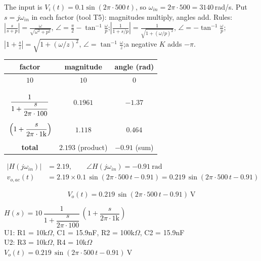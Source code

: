 \documentclass[11pt]{article}
\begin{document}
The input is $V_i(t) = 0.1\sin\left(2\pi\cdot 500\,t\right)$, so $\omega_{in} = 2\pi\cdot 500 = 3140$\,rad/s. Put $s=j\omega_{in}$ in each factor (tool T5): magnitudes multiply, angles add.
{\small Rules: $\left|\frac{s}{s+p}\right| = \frac{\omega}{\sqrt{\omega^2+p^2}}$, $\angle = \frac{\pi}{2}-\tan^{-1}\frac{\omega}{p}$;\quad $\left|\frac{1}{1+s/p}\right| = \frac{1}{\sqrt{1+(\omega/p)^2}}$, $\angle = -\tan^{-1}\frac{\omega}{p}$;\quad $\left|1+\frac{s}{z}\right| = \sqrt{1+(\omega/z)^2}$, $\angle = \tan^{-1}\frac{\omega}{z}$;\quad a negative $K$ adds $-\pi$.}
\begin{center}\renewcommand{\arraystretch}{1.35}
\begin{tabular}{ccc}
\toprule
factor & magnitude & angle (rad) \\
\midrule
$10$ & $10$ & $0$ \\
$\rule[-1.7em]{0pt}{4em}\dfrac{1}{1+\dfrac{s}{2\pi\cdot 100}}$ & $0.1961$ & $-1.37$ \\
$\rule[-1.1em]{0pt}{2.8em}\left(1+\dfrac{s}{2\pi\cdot 1\mathrm{k}}\right)$ & $1.118$ & $0.464$ \\
\textbf{total} & $\mathbf{2.193}$ (product) & $\mathbf{-0.91}$ (sum) \\
\bottomrule
\end{tabular}\end{center}

\begin{align*}
|H(j\omega_{in})| &= 2.19, \qquad \angle H(j\omega_{in}) = -0.91\ \mathrm{rad} \\
v_{o,ac}(t) &= 2.19\times 0.1\,\sin\left(2\pi\cdot 500\,t - 0.91\right) = 0.219\,\sin\left(2\pi\cdot 500\,t - 0.91\right)
\end{align*}

\[
\boxed{V_o(t) = 0.219\,\sin\left(2\pi\cdot 500\,t - 0.91\right)\ \mathrm{V}}
\]

\begin{ansbox}
$H(s) = 10\,\dfrac{1}{1+\dfrac{s}{2\pi\cdot 100}}\,\left(1+\dfrac{s}{2\pi\cdot 1\mathrm{k}}\right)$\\[4pt]
U1: R1 = 10k$\Omega$, C1 = 15.9nF, R2 = 100k$\Omega$, C2 = 15.9nF\\
U2: R3 = 10k$\Omega$, R4 = 10k$\Omega$\\[4pt]
$V_o(t) = 0.219\,\sin\left(2\pi\cdot 500\,t - 0.91\right)\ \mathrm{V}$
\end{ansbox}

\newpage
\end{document}
